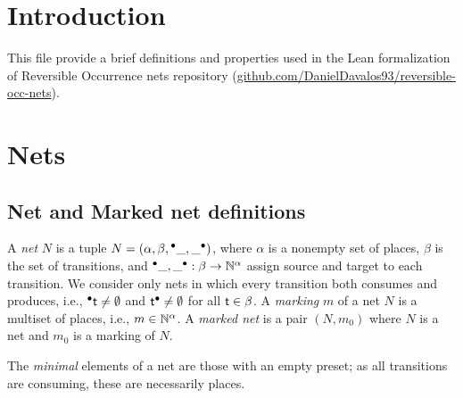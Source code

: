 %

\chapter*{Introduction}

This file provide a brief definitions and properties used in the Lean formalization of Reversible Occurrence nets repository (\url{github.com/DanielDavalos93/reversible-occ-nets}).

\chapter{Nets}

\section{Net and Marked net definitions}

\begin{definition}
  \label{def:net}
  A \emph{net} $N$ is a tuple $N = (\alpha, \beta, {}^\bullet{\_}, \_^\bullet)$,
  where $\alpha$ is a nonempty set of places, $\beta$ is the set of
  transitions, and
  ${}^\bullet{\_}, \_^\bullet: \beta\rightarrow \mathbb{N}^{\alpha}$ assign source and
  target to each transition. We consider only nets in which every transition
  both consumes and produces, i.e., ${}^\bullet{{\sf t}} \neq\emptyset$ and
  ${\sf t}^\bullet \neq\emptyset$ for all ${\sf t}\in \beta$.
  A \emph{marking} $m$ of a net $N$ is a multiset of places, i.e.,
  $m\in\mathbb{N}^{\alpha}$.
  A \emph{marked net} is a pair $(N, m_0)$ where $N$ is a net and $m_0$ is
  a marking of $N$.
\end{definition}

\begin{definition}[Minimal]
  \label{def:minimal}
The \emph{minimal} elements of a net are those with an empty preset; as all transitions are consuming, these are necessarily places.
\end{definition}

